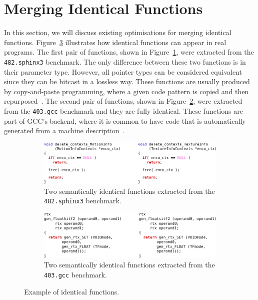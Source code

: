 
\section{Merging Identical Functions}

In this section, we will discuss existing optimisations for merging identical functions.
Figure~\ref{fig:example-identical} illustrates how identical functions can appear in real programs.
The first pair of functions, shown in Figure~\ref{fig:example-identical-1-sphinx3}, were extracted from the \texttt{482.sphinx3} benchmark.
The only difference between these two functions is in their parameter type.
However, all pointer types can be considered equivalent since they can be bitcast in a lossless way.
These functions are usually produced by copy-and-paste programming, where a given code pattern is copied and then repurposed~\cite{kim04,jablonski10,ahmed15}.
The second pair of functions, shown in Figure~\ref{fig:example-identical-2-gcc}, were extracted from the \texttt{403.gcc} benchmark and they are fully identical.
These functions are part of GCC's backend, where it is common to have code that is automatically generated from a machine description~\cite{muchnick98,kolek13,ghica15}.

\begin{figure}[h]
\centering
\begin{subfigure}{\textwidth}
\centering
\includegraphics[scale=0.9]{src/relatedwork/figs/example-identical-1-sphinx3}
\caption{Two semantically identical functions extracted from the \texttt{482.sphinx3} benchmark.}
\label{fig:example-identical-1-sphinx3}
\end{subfigure}
\begin{subfigure}{\textwidth}
\centering
\includegraphics[scale=0.9]{src/relatedwork/figs/example-identical-2-gcc}
\caption{Two semantically identical functions extracted from the \texttt{403.gcc} benchmark.}
\label{fig:example-identical-2-gcc}
\end{subfigure}
\caption{Example of identical functions.}
\label{fig:example-identical}
\end{figure}

